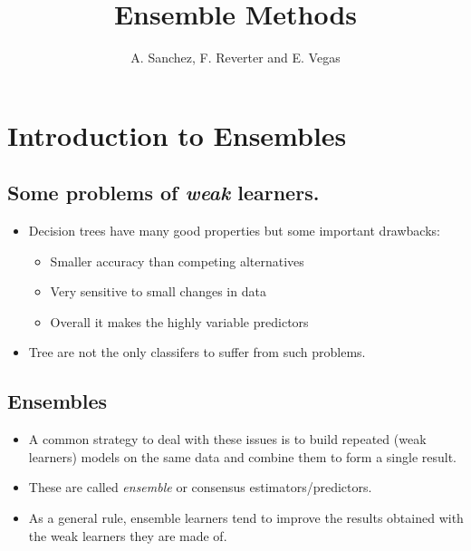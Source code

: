 \documentclass[
  letterpaper,
  DIV=11,
  numbers=noendperiod]{scrartcl}
\title{Ensemble Methods}
\author{A. Sanchez, F. Reverter and E. Vegas}
\date{}
\providecommand{\tightlist}{%
  \setlength{\itemsep}{0pt}\setlength{\parskip}{0pt}}\usepackage{longtable,booktabs,array}
\begin{document}
\maketitle
\ifdefined\Shaded\renewenvironment{Shaded}{\begin{tcolorbox}[boxrule=0pt, breakable, enhanced, sharp corners, interior hidden, frame hidden, borderline west={3pt}{0pt}{shadecolor}]}{\end{tcolorbox}}\fi

\hypertarget{introduction-to-ensembles}{%
\section{Introduction to Ensembles}\label{introduction-to-ensembles}}

\hypertarget{some-problems-of-weak-learners.}{%
\subsection{\texorpdfstring{Some problems of \emph{weak}
learners.}{Some problems of weak learners.}}\label{some-problems-of-weak-learners.}}

\begin{itemize}
\tightlist
\item
  Decision trees have many good properties but some important drawbacks:

  \begin{itemize}
  \tightlist
  \item
    Smaller accuracy than competing alternatives
  \item
    Very sensitive to small changes in data
  \item
    Overall it makes the highly variable predictors
  \end{itemize}
\item
  Tree are not the only classifers to suffer from such problems.
\end{itemize}

\hypertarget{ensembles}{%
\subsection{Ensembles}\label{ensembles}}

\begin{itemize}
\item
  A common strategy to deal with these issues is to build repeated (weak
  learners) models on the same data and combine them to form a single
  result.
\item
  These are called \emph{ensemble} or consensus estimators/predictors.
\item
  As a general rule, ensemble learners tend to improve the results
  obtained with the weak learners they are made of.
\end{itemize}
\end{document}
